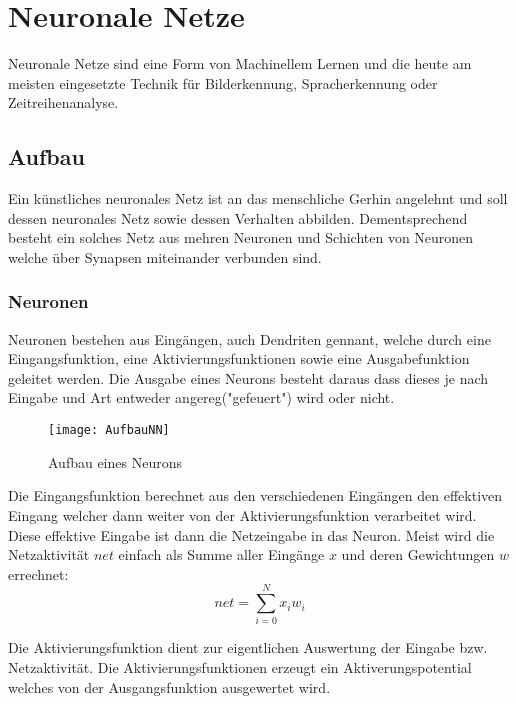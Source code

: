     \section{Neuronale Netze}
    \cite[Vgl. im Folgenden]{EinfuehrunginNN,WissensbasierteSysteme}
    Neuronale Netze sind eine Form von Machinellem Lernen und die heute am meisten eingesetzte Technik für Bilderkennung, Spracherkennung oder Zeitreihenanalyse.
    
    \subsection{Aufbau}
    Ein künstliches neuronales Netz ist an das menschliche Gerhin angelehnt und soll dessen neuronales Netz sowie dessen Verhalten abbilden. 
    Dementsprechend besteht ein solches Netz aus mehren Neuronen und Schichten von Neuronen welche über Synapsen miteinander verbunden sind.


    \subsubsection{Neuronen}
    Neuronen bestehen aus Eingängen, auch Dendriten gennant, welche durch eine Eingangsfunktion, eine Aktivierungsfunktionen sowie eine Ausgabefunktion geleitet werden.
    Die Ausgabe eines Neurons besteht daraus dass dieses je nach Eingabe und Art entweder angereg("gefeuert") wird oder nicht.
    
    \begin{figure}[H]
        \centering
        \texttt{[image: AufbauNN]}
        \caption{Aufbau eines Neurons}
        \label{fig:AufbauNN}
    \end{figure}
    
    \noindent
    Die Eingangsfunktion berechnet aus den verschiedenen Eingängen den effektiven Eingang welcher dann weiter von der Aktivierungsfunktion verarbeitet wird.
    Diese effektive Eingabe ist dann die Netzeingabe in das Neuron.
    Meist wird die Netzaktivität \(net\) einfach als Summe aller Eingänge \(x\) und deren Gewichtungen \(w\) errechnet:
    \begin{equation}
        net = \sum_{i=0}^N x_i w_i
    \end{equation}
    \newline

    \noindent
    Die Aktivierungsfunktion dient zur eigentlichen Auswertung der Eingabe bzw. Netzaktivität.
    Die Aktivierungsfunktionen erzeugt ein Aktiverungspotential welches von der Ausgangsfunktion ausgewertet wird.
    \newline
    
